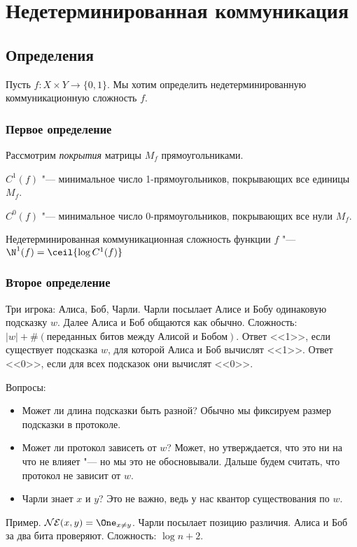 \chapter{Недетерминированная коммуникация}

\section{Определения}
Пусть $f\colon X\times Y\to \{0, 1\}$. Мы хотим определить недетерминированную коммуникационную сложность $f$.

\subsection{Первое определение}
Рассмотрим \emph{покрытия} матрицы $M_f$ прямоугольниками.

\begin{definition}
$C^1(f)$ "--- минимальное число 1-прямоугольников, покрывающих все единицы $M_f$.

$C^0(f)$ "--- минимальное число 0-прямоугольников, покрывающих все нули $M_f$.

Недетерминированная коммуникационная сложность функции $f$ "--- $\N^1(f) = \ceil{\log C^1(f)}$
\end{definition}

\subsection{Второе определение}
Три игрока: Алиса, Боб, Чарли.
Чарли посылает Алисе и Бобу одинаковую подсказку $w$.
Далее Алиса и Боб общаются как обычно.
Сложность: $|w| + \#(\text{переданных битов между Алисой и Бобом})$.
Ответ <<1>>, если существует подсказка $w$, для которой Алиса и Боб вычислят <<1>>. Ответ <<0>>, если для всех подсказок они вычислят <<0>>.

Вопросы:
\begin{itemize}
\item Может ли длина подсказки быть разной? Обычно мы фиксируем размер подсказки в протоколе.
\item Может ли протокол зависеть от $w$? Может, но утверждается, что это ни на что не влияет "--- но мы это не обосновывали. Дальше будем считать, что протокол не зависит от $w$.
\item Чарли знает $x$ и $y$? Это не важно, ведь у нас квантор существования по $w$.
\end{itemize}

Пример.
$\mathcal{NE}(x, y) = \One_{x\neq y}$.
Чарли посылает позицию различия. Алиса и Боб за два бита проверяют. Сложность: $\log n + 2$.

